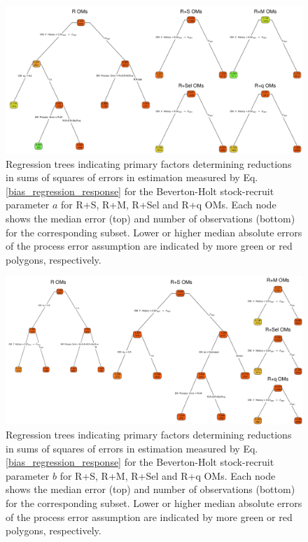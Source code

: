 \documentclass[
  12pt,
]{article}
\begin{document}
\begin{landscape}
\begin{figure}
\begin{center}
\includegraphics{SR_a_bias_regtree_plots}
\end{center}
\caption{Regression trees indicating primary factors determining reductions in sums of squares of errors in estimation measured by Eq. \ref{bias_regression_response} for the Beverton-Holt stock-recruit parameter $a$ for R+S, R+M, R+Sel and R+q OMs. Each node shows the median error (top) and number of observations (bottom) for the corresponding subset. Lower or higher median absolute errors of the process error assumption are indicated by more green or red polygons, respectively.}\label{SR_a_bias_regtree}
\end{figure}
\end{landscape}

\begin{landscape}
\begin{figure}
\begin{center}
\includegraphics{SR_b_bias_regtree_plots}
\end{center}
\caption{Regression trees indicating primary factors determining reductions in sums of squares of errors in estimation measured by Eq. \ref{bias_regression_response} for the Beverton-Holt stock-recruit parameter $b$ for R+S, R+M, R+Sel and R+q OMs. Each node shows the median error (top) and number of observations (bottom) for the corresponding subset. Lower or higher median absolute errors of the process error assumption are indicated by more green or red polygons, respectively.}\label{SR_b_bias_regtree}
\end{figure}
\end{landscape}
\end{document}
